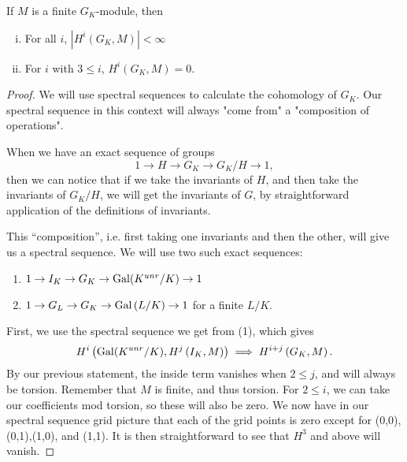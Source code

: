 \begin{proposition} \label{prop:finite:module}
If \(M\) is a finite \(G_{K}\)-module, then
\begin{enumerate}[(i)]
	\item For all \(i\), \(\left| H^{i}(G_{K},M) \right| < \infty\) 
	\item \coproof For \(i\) with \(3 \leq i\), 
			\(H^{i}(G_{K},M) = 0\).
\end{enumerate}
\end{proposition}



\begin{proof}
			We will use spectral sequences to calculate the cohomology
			of \(G_{K}\). 
			Our spectral sequence in this context will always "come from"
			a "composition of operations".

			When we have an exact sequence of groups
			\[
			1 \to H \to G_{K} \to G_{K} / H \to 1	
			,\] 
			then we can notice that if we take the invariants of \(H\), and
			then take the invariants of \(G_{K} / H\), we will get
			the invariants of \(G\), by straightforward application of
			the definitions of invariants.

			This ``composition'', i.e. first taking one invariants and 
			then the other, will give us a spectral sequence.
			We will use two such exact sequences:
			\begin{enumerate}[(1)]
				\item \(1 \to I_{K} \to G_{K} \to \operatorname{Gal}(K^{unr} / K) \to 1\) 
				\item \(1 \to G_{L} \to G_{K} \to \operatorname{Gal}\left( L / K \right) \to 1\) 
					for a finite \(L / K\).
			\end{enumerate}
					
			First, we use the spectral sequence we get from (1), which
			gives 
			\[
				H^{i}\left( \operatorname{Gal}(K^{unr} / K), 
				H^{j}\left( I_{K}, M \right)\right) 
				\implies H^{i + j}\left( G_{K},M \right)
			.\] 
			By our previous statement, the inside term vanishes when
			\(2 \leq j\), and will always be torsion.
			Remember that \(M\) is finite, and thus torsion.
			For \(2 \leq i\), we can take our coefficients mod torsion,
			so these will also be zero. %
			We now have in our spectral sequence grid picture that 
			each of the grid points is zero except for 
			(0,0),(0,1),(1,0), and (1,1).
			It is then straightforward to see that \(H^{3}\) and above
			will vanish.


\end{proof}
